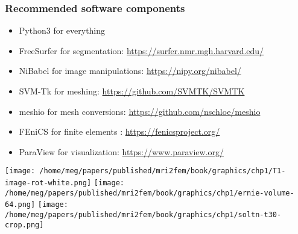 \documentclass[10pt, mathserif, aspectratio=169, t, usenames, dvipsnames]{beamer}
\begin{document}
\begin{frame}
\frametitle{Recommended software components}

\begin{itemize}
\item
  Python3 for everything
\item
  FreeSurfer for segmentation: \href{https://surfer.nmr.mgh.harvard.edu/}{https://surfer.nmr.mgh.harvard.edu/}
\item
  NiBabel for image manipulations: \href{https://nipy.org/nibabel/}{https://nipy.org/nibabel/}
\item
  SVM-Tk for meshing: \href{https://github.com/SVMTK/SVMTK}{https://github.com/SVMTK/SVMTK}
\item
  meshio for mesh conversions: \href{https://github.com/nschloe/meshio}{https://github.com/nschloe/meshio}
\item
  FEniCS for finite elements : \href{https://fenicsproject.org/}{https://fenicsproject.org/}
\item
  ParaView for visualization: \href{https://www.paraview.org/}{https://www.paraview.org/}
\end{itemize}

\medskip
  \begin{center}
  \texttt{[image: /home/meg/papers/published/mri2fem/book/graphics/chp1/T1-image-rot-white.png]}
  \texttt{[image: /home/meg/papers/published/mri2fem/book/graphics/chp1/ernie-volume-64.png]}
  \texttt{[image: /home/meg/papers/published/mri2fem/book/graphics/chp1/soltn-t30-crop.png]}
  \end{center}

\end{frame}
\end{document}
